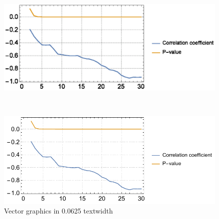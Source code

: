 \documentclass{egpubl}
\begin{document}
\begin{figure}
	\centering
	\begin{minipage}{0.0625\textwidth}
		\includegraphics[width=1\linewidth]{images/D_spearman.eps}
	\end{minipage}~
	\begin{minipage}{0.0625\textwidth}
		\includegraphics[width=1\linewidth]{images/D_spearman.pdf}
	\end{minipage}
	\caption{Vector graphics in 0.0625 textwidth}
	\label{fig:vector_graphics4}
\end{figure}
	
	
	
	
	
\end{document}
